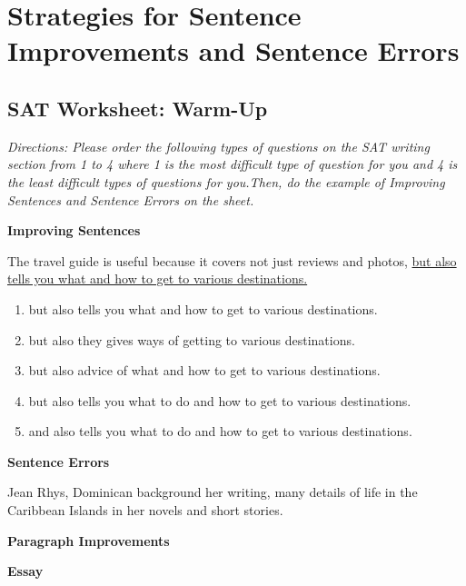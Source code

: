 \section{Strategies for Sentence Improvements and Sentence Errors}

\subsection{SAT Worksheet: Warm-Up}

\textit{Directions: Please order the following types of questions on the SAT writing section from 1 to 4 where 1 is the most difficult type of question for you and 4 is the least difficult types of questions for you.Then, do the example of Improving Sentences and Sentence Errors on the sheet.}

\bigskip
\underline{\hspace{2in}} \textbf{Improving Sentences}

\bigskip
The travel guide is useful because it covers not just reviews and photos, \ul{ but also tells you what and how to get to various destinations.}

\begin{enumerate}[label=(\Alph*)]
\item{but also tells you what and how to get to various destinations.}
\item{but also they gives ways of getting to various destinations.}
\item{but also advice of what and how to get to various destinations.}
\item{but also tells you what to do and how to get to various destinations.}
\item{and also tells you what to do and how to get to various destinations.}
\end{enumerate}

\bigskip
\underline{\hspace{2in}} \textbf{Sentence Errors}

\bigskip
\begin{spacing}{1.5}
\begin{inparaenum}[A]
Jean Rhys,  Dominican background  her writing,  many details of life in the Caribbean Islands  in her novels and short stories. 
\end{inparaenum}
\end{spacing}

\bigskip
\underline{\hspace{2in}} \textbf{Paragraph Improvements}

\bigskip
\underline{\hspace{2in}} \textbf{Essay}